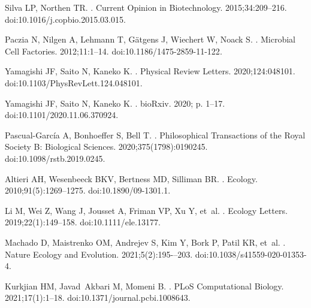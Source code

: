 \documentclass[10pt,letterpaper]{article}
\begin{document}
\begin{thebibliography}{10}
Silva LP, Northen TR.
.
\newblock Current Opinion in Biotechnology. 2015;34:209--216.
\newblock doi:{10.1016/j.copbio.2015.03.015}.

Paczia N, Nilgen A, Lehmann T, G{\"{a}}tgens J, Wiechert W, Noack S.
.
\newblock Microbial Cell Factories. 2012;11:1--14.
\newblock doi:{10.1186/1475-2859-11-122}.

Yamagishi JF, Saito N, Kaneko K.
.
\newblock Physical Review Letters. 2020;124:048101.
\newblock doi:{10.1103/PhysRevLett.124.048101}.

Yamagishi JF, Saito N, Kaneko K.
.
\newblock bioRxiv. 2020; p. 1--17.
\newblock doi:{10.1101/2020.11.06.370924}.

Pascual-Garc{\'{i}}a A, Bonhoeffer S, Bell T.
.
\newblock Philosophical Transactions of the Royal Society B: Biological Sciences. 2020;375(1798):0190245.
\newblock doi:{10.1098/rstb.2019.0245}.

Altieri AH, Wesenbeeck BKV, Bertness MD, Silliman BR.
.
\newblock Ecology. 2010;91(5):1269--1275.
\newblock doi:{10.1890/09-1301.1}.

Li M, Wei Z, Wang J, Jousset A, Friman VP, Xu Y, et~al.
.
\newblock Ecology Letters. 2019;22(1):149--158.
\newblock doi:{10.1111/ele.13177}.

Machado D, Maistrenko OM, Andrejev S, Kim Y, Bork P, Patil KR, et~al.
.
\newblock Nature Ecology and Evolution. 2021;5(2):195-–203.
\newblock doi:{10.1038/s41559-020-01353-4}.

Kurkjian HM, Javad~Akbari M, Momeni B.
.
\newblock PLoS Computational Biology. 2021;17(1):1--18.
\newblock doi:{10.1371/journal.pcbi.1008643}.


\end{thebibliography}
\end{document}
